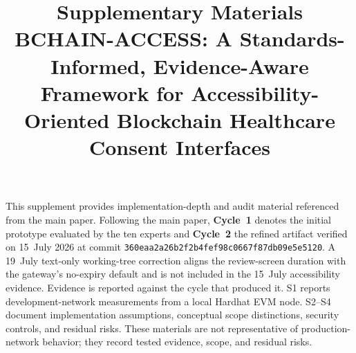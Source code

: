 \documentclass[10pt]{article}
\title{\textbf{Supplementary Materials}\\[3pt]\large BCHAIN-ACCESS: A Standards-Informed, Evidence-Aware Framework for Accessibility-Oriented Blockchain Healthcare Consent Interfaces}
\date{}
\begin{document}
\maketitle
\noindent This supplement provides implementation-depth and audit material referenced from the main paper. Following the main paper, \textbf{Cycle~1} denotes the initial prototype evaluated by the ten experts and \textbf{Cycle~2} the refined artifact verified on 15~July 2026 at commit \texttt{360eaa2a26b2f2b4fef98c0667f87db09e5e5120}. A 19~July text-only working-tree correction aligns the review-screen duration with the gateway's no-expiry default and is not included in the 15~July accessibility evidence. Evidence is reported against the cycle that produced it. S1 reports development-network measurements from a local Hardhat EVM node. S2--S4 document implementation assumptions, conceptual scope distinctions, security controls, and residual risks. These materials are not representative of production-network behavior; they record tested evidence, scope, and residual risks.
\end{document}
